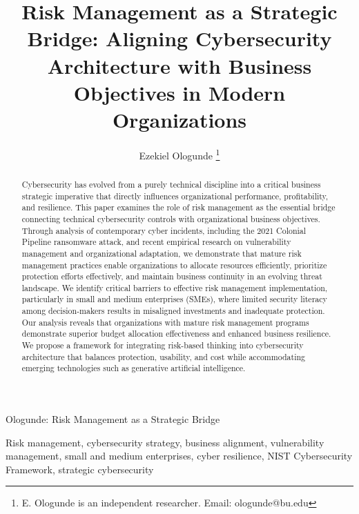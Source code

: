 \documentclass[journal]{IEEEtran}
\begin{document}
\title{Risk Management as a Strategic Bridge: Aligning Cybersecurity Architecture with Business Objectives in Modern Organizations}

\author{Ezekiel Ologunde%
\thanks{E. Ologunde is an independent researcher. Email: ologunde@bu.edu}}

\markboth{}%
{Ologunde: Risk Management as a Strategic Bridge}

\maketitle

\begin{abstract}
Cybersecurity has evolved from a purely technical discipline into a critical business
strategic imperative that directly influences organizational performance, profitability,
and resilience. This paper examines the role of risk management as the essential bridge
connecting technical cybersecurity controls with organizational business objectives.
Through analysis of contemporary cyber incidents, including the 2021 Colonial Pipeline
ransomware attack, and recent empirical research on vulnerability management and
organizational adaptation, we demonstrate that mature risk management practices enable
organizations to allocate resources efficiently, prioritize protection efforts
effectively, and maintain business continuity in an evolving threat landscape. We
identify critical barriers to effective risk management implementation, particularly in
small and medium enterprises (SMEs), where limited security literacy among
decision-makers results in misaligned investments and inadequate protection. Our analysis
reveals that organizations with mature risk management programs demonstrate superior
budget allocation effectiveness and enhanced business resilience. We propose a framework
for integrating risk-based thinking into cybersecurity architecture that balances
protection, usability, and cost while accommodating emerging technologies such as
generative artificial intelligence.
\end{abstract}

\begin{IEEEkeywords}
Risk management, cybersecurity strategy, business alignment, vulnerability management,
small and medium enterprises, cyber resilience, NIST Cybersecurity Framework,
strategic cybersecurity
\end{IEEEkeywords}
\end{document}
